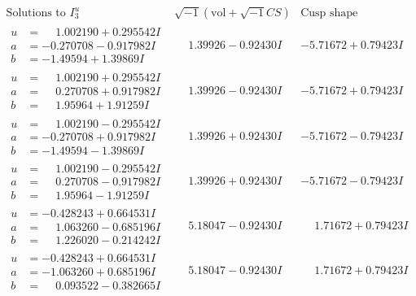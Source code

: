 \documentclass[1p]{elsarticle_modified}
\theoremstyle{definition}
\newcommand{\I}{\sqrt{-1}}
\begin{document}
$$\begin{array}{c|c|c}  
\text{Solutions to }I^u_{3}& \I (\text{vol} + \sqrt{-1}CS) & \text{Cusp shape}\\
 \hline 
\begin{aligned}
u &= \phantom{-}1.002190 + 0.295542 I \\
a &= -0.270708 - 0.917982 I \\
b &= -1.49594 + 1.39869 I\end{aligned}
 & \phantom{-}1.39926 - 0.92430 I & -5.71672 + 0.79423 I \\ \hline\begin{aligned}
u &= \phantom{-}1.002190 + 0.295542 I \\
a &= \phantom{-}0.270708 + 0.917982 I \\
b &= \phantom{-}1.95964 + 1.91259 I\end{aligned}
 & \phantom{-}1.39926 - 0.92430 I & -5.71672 + 0.79423 I \\ \hline\begin{aligned}
u &= \phantom{-}1.002190 - 0.295542 I \\
a &= -0.270708 + 0.917982 I \\
b &= -1.49594 - 1.39869 I\end{aligned}
 & \phantom{-}1.39926 + 0.92430 I & -5.71672 - 0.79423 I \\ \hline\begin{aligned}
u &= \phantom{-}1.002190 - 0.295542 I \\
a &= \phantom{-}0.270708 - 0.917982 I \\
b &= \phantom{-}1.95964 - 1.91259 I\end{aligned}
 & \phantom{-}1.39926 + 0.92430 I & -5.71672 - 0.79423 I \\ \hline\begin{aligned}
u &= -0.428243 + 0.664531 I \\
a &= \phantom{-}1.063260 - 0.685196 I \\
b &= \phantom{-}1.226020 - 0.214242 I\end{aligned}
 & \phantom{-}5.18047 - 0.92430 I & \phantom{-}1.71672 + 0.79423 I \\ \hline\begin{aligned}
u &= -0.428243 + 0.664531 I \\
a &= -1.063260 + 0.685196 I \\
b &= \phantom{-}0.093522 - 0.382665 I\end{aligned}
 & \phantom{-}5.18047 - 0.92430 I & \phantom{-}1.71672 + 0.79423 I \\ \hline\begin{aligned}

\end{aligned}
\end{array}$$
\end{document}
